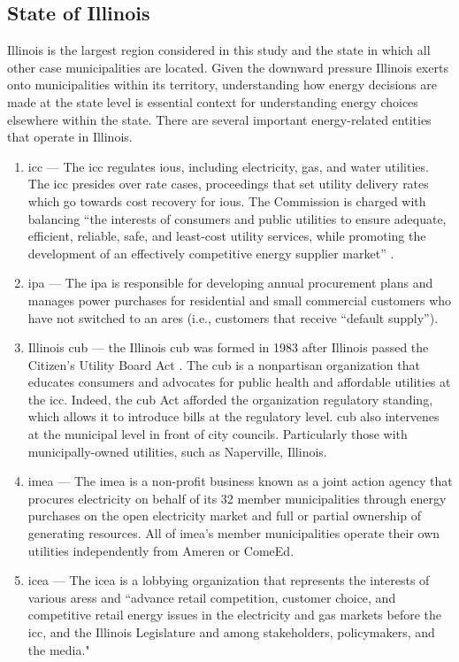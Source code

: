 \subsection{State of Illinois}
Illinois is the largest region considered in this study and the state in which
all other case municipalities are located. Given the downward pressure Illinois
exerts onto municipalities within its territory, understanding how energy
decisions are made at the state level is essential context for understanding
energy choices elsewhere within the state. There are several important
energy-related entities that operate in Illinois.

\begin{enumerate}
    \item \acf{icc} --- The \ac{icc} regulates \acp{iou}, including electricity,
    gas, and water utilities. The \ac{icc} presides over rate cases, proceedings
    that set utility delivery rates which go towards cost recovery for
    \acp{iou}. The Commission is charged with balancing ``the interests of
    consumers and public utilities to ensure adequate, efficient, reliable,
    safe, and least-cost utility services, while promoting the development of an
    effectively competitive energy supplier market''
    \cite{illinois_commerce_commision_icc_citizens_2022}.
    \item \acf{ipa} --- The \ac{ipa} is responsible for developing annual
    procurement plans and manages power purchases for residential and small
    commercial customers who have not switched to an \ac{ares} (i.e., customers
    that receive ``default supply'').
    \item Illinois \acf{cub} --- the Illinois \ac{cub} was formed in 1983 after
    Illinois passed the Citizen's Utility Board Act
    \cite{illinois_83rd_general_assembly_citizens_1983}. The \ac{cub} is a
    nonpartisan organization that educates consumers and advocates for public
    health and affordable utilities at the \ac{icc}. Indeed, the \ac{cub} Act
    afforded the organization regulatory standing, which allows it to
    introduce bills at the regulatory level. \ac{cub} also intervenes at the
    municipal level in front of city councils. Particularly those with
    municipally-owned utilities, such as Naperville, Illinois.
    \item \acf{imea} --- The \ac{imea} is a non-profit business known as a joint
    action agency that procures electricity on behalf of its 32 member
    municipalities through energy purchases on the open electricity market and
    full or partial ownership of generating resources. All of \ac{imea}'s member
    municipalities operate their own utilities independently from Ameren or ComeEd.
    \item \acf{icea} --- The \ac{icea} is a lobbying organization that
    represents the interests of various \acp{ares} and ``advance retail
    competition, customer choice, and competitive retail energy issues in the
    electricity and gas markets before the \ac{icc}, and the Illinois
    Legislature and among stakeholders, policymakers, and the media."
\end{enumerate}

